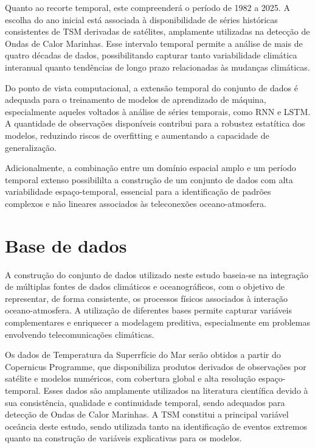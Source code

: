	Quanto ao recorte temporal, este compreenderá o período de 1982 a 2025. A escolha do ano inicial está associada à disponibilidade de séries históricas consistentes de TSM derivadas de satélites, amplamente utilizadas na detecção de Ondas de Calor Marinhas. 
	Esse intervalo temporal permite a análise de mais de quatro décadas de dados, possibilitando capturar tanto variabilidade climática interanual quanto tendências de longo prazo relacionadas às mudanças climáticas.

	Do ponto de vista computacional, a extensão temporal do conjunto de dados é adequada para o treinamento de modelos de aprendizado de máquina, especialmente aqueles voltados à análise de séries temporais, como RNN e LSTM. 
	A quantidade de observações disponíveis contribui para a robustez estatítica dos modelos, reduzindo riscos de overfitting e aumentando a capacidade de generalização.

	Adicionalmente, a combinação entre um domínio espacial amplo e um período temporal extenso possibililta a construção de um conjunto de dados com alta variabilidade espaço-temporal, essencial para a identificação de padrões complexos e não lineares associados às teleconexões oceano-atmosfera.


\section{Base de dados}\label{sec:base-dados}

	A construção do conjunto de dados utilizado neste estudo baseia-se na integração de múltiplas fontes de dados climáticos e oceanográficos, com o objetivo de representar, de forma consistente, os processos físicos associados à interação oceano-atmosfera.
	A utilização de diferentes bases permite capturar variáveis complementares e enriquecer a modelagem preditiva, especialmente em problemas envolvendo telecomunicações climáticas.

	Os dados de Temperatura da Superrfície do Mar serão obtidos a partir do Copernicus Programme, que disponibiliza produtos derivados de observações por satélite e modelos numéricos, com cobertura global e alta resolução espaço-temporal. Esses dados são amplamente utilizados na literatura científica devido à sua consistência, qualidade e continuidade temporal, sendo adequados para detecção de Ondas de Calor Marinhas.
	A TSM constitui a principal variável oceância deste estudo, sendo utilizada tanto na identificação de eventos extremos quanto na construção de variáveis explicativas para os modelos.

